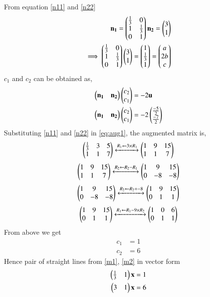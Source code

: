 \documentclass[journal,12pt,twocolumn]{IEEEtran}
\begin{document}
From equation \eqref{n11} and \eqref{n22}
\begin{align}
    \mathbf{n_1}=\begin{pmatrix}\frac{1}{3}&0\\1&\frac{1}{3}\\0&1\end{pmatrix}
    \mathbf{n_2}=\begin{pmatrix}3\\ 1\end{pmatrix}\label{eq:conv2}\\
\implies \begin{pmatrix}\frac{1}{3}&0\\1&\frac{1}{3}\\0&1\end{pmatrix}\begin{pmatrix}3\\ 1\end{pmatrix} = \begin{pmatrix}1\\\frac{1}{3}\\1\end{pmatrix} = \begin{pmatrix}a\\2b\\c\end{pmatrix}\label{eq:conv3}
\end{align}
$c_1$ and $c_2$ can be obtained as,
\begin{align}
\begin{pmatrix}\mathbf{n_1} & \mathbf{n_2}\end{pmatrix}\begin{pmatrix}c_2\\c_1\end{pmatrix}&=-2\mathbf{u}\\
\begin{pmatrix}\mathbf{n_1} & \mathbf{n_2}\end{pmatrix}\begin{pmatrix}c_2\\c_1\end{pmatrix}&=-2\begin{pmatrix}\frac{-5}{2}\\\frac{-7}{2}\end{pmatrix}
\label{eq:aug1}
\end{align}
Substituting \eqref{n11} and \eqref{n22} in \eqref{eq:aug1}, the augmented matrix is,
\begin{align}
\begin{pmatrix}\frac{1}{3} & 3& 5 \\ 1 & 1 & 7\end{pmatrix}
\xleftrightarrow[]{R_1 \leftarrow 3\times R_1}
\begin{pmatrix}1 & 9&15\\ 1 & 1 & 7\end{pmatrix}
\end{align}
\begin{align}
\begin{pmatrix}1 & 9&15\\ 1 & 1 & 7\end{pmatrix}
\xleftrightarrow[]{R_2 \leftarrow R_2- R_1}
\begin{pmatrix}1 & 9&15\\ 0 & -8 & -8\end{pmatrix}
\end{align}
\begin{align}
\begin{pmatrix}1 & 9&15\\ 0 & -8 & -8\end{pmatrix}
\xleftrightarrow[]{R_2 \leftarrow R_2\div -8}
\begin{pmatrix}1 & 9&15\\ 0 & 1 & 1\end{pmatrix}
\end{align}
\begin{align}
\begin{pmatrix}1 & 9&15\\ 0 & 1 & 1\end{pmatrix}
\xleftrightarrow[]{R_1 \leftarrow R_1-9\times R_2}
\begin{pmatrix}1 & 0&6\\ 0 & 1&1 \end{pmatrix}
\end{align}
From above  we get 
\begin{align}
    c_1&=1\\
    c_2&=6
\end{align}
Hence pair of straight lines  from  \eqref{m1}, \eqref{m2} in vector form
\begin{align}
    \begin{pmatrix}\frac{1}{3}& 1\end{pmatrix}\mathbf{x}&=1\\
    \begin{pmatrix}3 & 1\end{pmatrix}\mathbf{x}&=6
\end{align}
\end{document}
